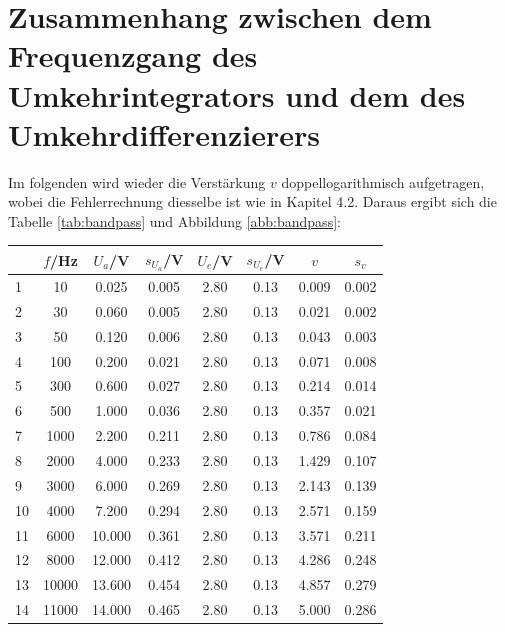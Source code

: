 \section*{Zusammenhang zwischen dem Frequenzgang des Umkehrintegrators und dem des Umkehrdifferenzierers}
Im folgenden wird wieder die Verstärkung $v$ doppellogarithmisch aufgetragen, wobei die Fehlerrechnung diesselbe ist wie in Kapitel 4.2. Daraus ergibt sich die Tabelle \ref{tab:bandpass} und Abbildung \ref{abb:bandpass}:
\begin{center}
    \begin{tabular}{l | c c c c c | c c}
        {} &       $f$/Hz &   $U_a$/V &  $s_{U_a}$/V &  $U_e$/V &  $s_{U_e}$/V &      $v$ &    $s_v$ \\
        \hline
        1  &       10 &   0.025 &      0.005 &    2.80 &       0.13 &  0.009 &  0.002 \\
        2  &       30 &   0.060 &      0.005 &    2.80 &       0.13 &  0.021 &  0.002 \\
        3  &       50 &   0.120 &      0.006 &    2.80 &       0.13 &  0.043 &  0.003 \\
        4  &      100 &   0.200 &      0.021 &    2.80 &       0.13 &  0.071 &  0.008 \\
        5  &      300 &   0.600 &      0.027 &    2.80 &       0.13 &  0.214 &  0.014 \\
        6  &      500 &   1.000 &      0.036 &    2.80 &       0.13 &  0.357 &  0.021 \\
        7  &     1000 &   2.200 &      0.211 &    2.80 &       0.13 &  0.786 &  0.084 \\
        8  &     2000 &   4.000 &      0.233 &    2.80 &       0.13 &  1.429 &  0.107 \\
        9  &     3000 &   6.000 &      0.269 &    2.80 &       0.13 &  2.143 &  0.139 \\
        10 &     4000 &   7.200 &      0.294 &    2.80 &       0.13 &  2.571 &  0.159 \\
        11 &     6000 &  10.000 &      0.361 &    2.80 &       0.13 &  3.571 &  0.211 \\
        12 &     8000 &  12.000 &      0.412 &    2.80 &       0.13 &  4.286 &  0.248 \\
        13 &    10000 &  13.600 &      0.454 &    2.80 &       0.13 &  4.857 &  0.279 \\
        14 &    11000 &  14.000 &      0.465 &    2.80 &       0.13 &  5.000 &  0.286 \\

\end{tabular}
\end{center}
